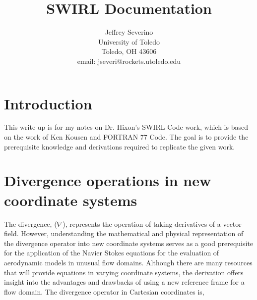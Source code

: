\documentclass[12pt]{article}
\begin{document}
\begin{titlepage}
\title{
SWIRL Documentation}


\author{ Jeffrey Severino
 \\
University of Toledo \\
Toledo, OH  43606 \\
email: jseveri@rockets.utoledo.edu  }

\maketitle

\end{titlepage}
\tableofcontents
\newpage
\section{Introduction}

This write up is for my notes on Dr. Hixon's SWIRL Code work, which is based on the work of Ken Kousen \cite{Kousen1999} and FORTRAN 77 Code. The goal is to provide the prerequisite knowledge and derivations required to replicate the given work. 

 
\section{Divergence operations in new coordinate systems}


The divergence, ($\nabla$), represents the operation of taking derivatives of a vector field. However, understanding the mathematical and physical representation of the divergence operator into new coordinate systems serves as a good prerequisite for the application of the Navier Stokes equations for the evaluation of aerodynamic models in unusual flow domains. Although there are many resources that will provide equations in varying coordinate systems, the derivation offers insight into the advantages and drawbacks of using a new reference frame for a flow domain. The divergence operator in Cartesian coordinates is,
\end{document}

